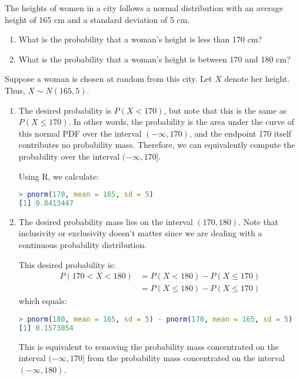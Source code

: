 \begin{exmp}\label{exmp:women_heights}
    The heights of women in a city follows a normal distribution with an average height of 165 cm and a standard deviation of 5 cm.
    \begin{enumerate}
        \item What is the probability that a woman's height is less than 170 cm?
        \item What is the probability that a woman's height is between 170 and 180 cm?
    \end{enumerate}
\end{exmp}
\begin{solution}
    Suppose a woman is chosen at random from this city.
    Let \( X \) denote her height.
    Thus, \( X \sim N(165, 5) \).
    \begin{enumerate}
        \item The desired probability is \( P(X < 170) \), but note that this is the same as \( P(X \leq 170) \).
        In other words, the probability is the area under the curve of this normal PDF over the interval \( (-\infty, 170) \),
        and the endpoint 170 itself contributes no probability mass.
        Therefore, we can equivalently compute the probability over the interval \( (-\infty, 170] \).

        Using R, we calculate:
        \begin{lstlisting}[language=R]
> pnorm(170, mean = 165, sd = 5)
[1] 0.8413447
        \end{lstlisting}
        \item The desired probability mass lies on the interval \( (170, 180) \).
        Note that inclusivity or exclusivity doesn't matter since we are dealing with a continuous probability distribution.

        This desired probability is:
        \begin{align*}
            P(170 < X < 180) &= P(X < 180) - P(X \leq 170)\\
            &= P(X \leq 180) - P(X \leq 170)
        \end{align*}
        which equals:
        \begin{lstlisting}[language=R]
> pnorm(180, mean = 165, sd = 5) - pnorm(170, mean = 165, sd = 5)
[1] 0.1573054
        \end{lstlisting}
        This is equivalent to removing the probability mass concentrated on the interval \( (-\infty, 170] \) from the probability mass concentrated on the interval \( (-\infty, 180) \).
    \end{enumerate}
\end{solution}
